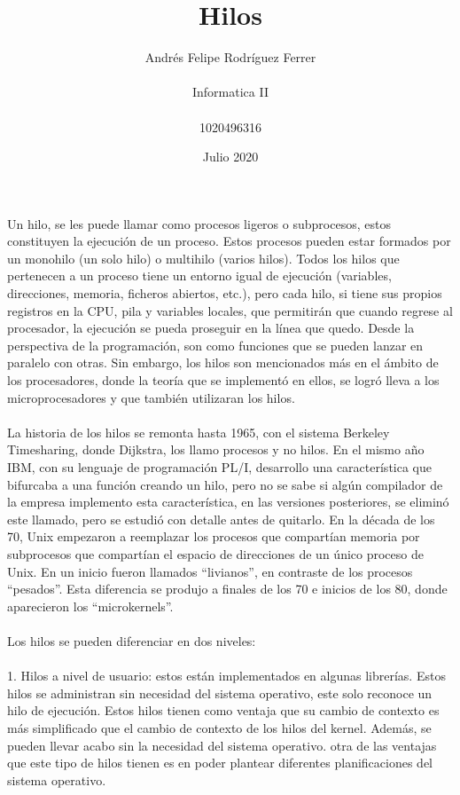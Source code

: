 \documentclass{article}
\title{Hilos}
\author{Andrés Felipe Rodríguez Ferrer\\\\Informatica II\\\\1020496316}
\date{Julio 2020}
\begin{document}
\maketitle
Un hilo, se les puede llamar como procesos ligeros o subprocesos, estos constituyen la ejecución de un proceso. Estos procesos pueden estar formados por un monohilo (un solo hilo) o multihilo (varios hilos). Todos los hilos que pertenecen a un proceso tiene un entorno igual de ejecución (variables, direcciones, memoria, ficheros abiertos, etc.), pero cada hilo, si tiene sus propios registros en la CPU, pila y variables locales, que permitirán que cuando regrese al procesador, la ejecución se pueda proseguir en la línea que quedo. Desde la perspectiva de la programación, son como funciones que se pueden lanzar en paralelo con otras. Sin embargo, los hilos son mencionados más en el ámbito de los procesadores, donde la teoría que se implementó en ellos, se logró lleva a los microprocesadores y que también utilizaran los hilos.\citep{1}\\\\
La historia de los hilos se remonta hasta 1965, con el sistema Berkeley Timesharing, donde Dijkstra, los llamo procesos y no hilos. En el mismo año IBM, con su lenguaje de programación PL/I, desarrollo una característica que bifurcaba a una función creando un hilo, pero no se sabe si algún compilador de la empresa implemento esta característica, en las versiones posteriores, se eliminó este llamado, pero se estudió con detalle antes de quitarlo. En la década de los 70, Unix empezaron a reemplazar los procesos que compartían memoria por subprocesos que compartían el espacio de direcciones de un único proceso de Unix. En un inicio fueron llamados “livianos”, en contraste de los procesos “pesados”. Esta diferencia se produjo a finales de los 70 e inicios de los 80, donde aparecieron los “microkernels”\citep{2}.\\\\Los hilos se pueden diferenciar en dos niveles:\\\\ 
1. Hilos a nivel de usuario: estos están implementados en algunas librerías. Estos hilos se administran sin necesidad del sistema operativo, este solo reconoce un hilo de ejecución. Estos hilos tienen como ventaja que su cambio de contexto es más simplificado que el cambio de contexto de los hilos del kernel. Además, se pueden llevar acabo sin la necesidad del sistema operativo. otra de las ventajas que este tipo de hilos tienen es en poder plantear diferentes planificaciones del sistema operativo.\citep{3}\\\\
\end{document}
